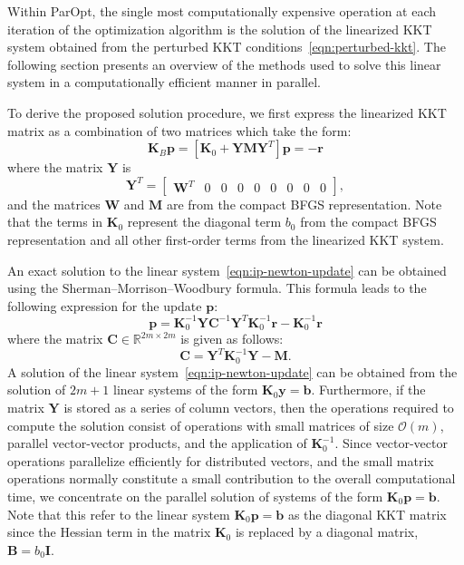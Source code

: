 \documentclass[12pt]{article}
\newcommand{\mb}{\mathbf}
\begin{document}
Within ParOpt, the single most computationally expensive operation at each iteration of the optimization algorithm is the solution of the linearized KKT system obtained from the perturbed KKT conditions~\eqref{eqn:perturbed-kkt}. 
The following section presents an overview of the methods used to solve this linear system in a computationally efficient manner in parallel. 

To derive the proposed solution procedure, we first express the linearized KKT matrix as a combination of two matrices which take the form:
%
\begin{equation}
  \label{eqn:ip-newton-update}
  \mb{K}_{B} \mb{p} = \left[ \mb{K}_{0} + \mb{Y} \mb{M} \mb{Y}^{T} \right] \mb{p} = - \mb{r}
\end{equation}
where the matrix $\mb{Y}$ is
%
\begin{equation*}
  \mb{Y}^{T} = \begin{bmatrix} \mb{W}^T & 0 & 0 & 
    0 & 0 & 0 & 0 & 0 & 0 \end{bmatrix}, 
\end{equation*}
and the matrices $\mb{W}$ and $\mb{M}$ are from the compact BFGS representation.
Note that the terms in $\mb{K}_{0}$ represent the diagonal term $b_{0}$ from the compact BFGS representation and all other first-order terms from the linearized KKT system.

An exact solution to the linear system~\eqref{eqn:ip-newton-update} can be obtained using the Sherman--Morrison--Woodbury formula.  
This formula leads to the following expression for the update $\mb{p}$:
\begin{equation*}
  \mb{p} = \mb{K}^{-1}_{0} \mb{Y} \mb{C}^{-1} \mb{Y}^{T} \mb{K}_{0}^{-1} \mb{r} - \mb{K}_{0}^{-1} \mb{r}  
\end{equation*}
where the matrix $\mb{C} \in \mathbb{R}^{2m \times 2m}$ is given as
follows:
\begin{equation*}
  \mb{C} = \mb{Y}^{T} \mb{K}_{0}^{-1}\mb{Y} - \mb{M}.
\end{equation*}
A solution of the linear system~\eqref{eqn:ip-newton-update} can be obtained from the solution of $2m+1$ linear systems of the form $\mb{K}_{0}\mb{y} = \mb{b}$.  
Furthermore, if the matrix $\mb{Y}$ is stored as a series of column vectors, then the operations required to compute the solution consist of operations with small matrices of size $\mathcal{O}(m)$, parallel vector-vector products, and the application of $\mb{K}_{0}^{-1}$. 
Since vector-vector operations parallelize efficiently for distributed vectors, and the small matrix operations normally constitute a small contribution to the overall computational time, we concentrate on the parallel solution of systems of the form $\mb{K}_{0} \mb{p} =
\mb{b}$. 
Note that this refer to the linear system $\mb{K}_{0} \mb{p} = \mb{b}$ as the diagonal KKT matrix since the Hessian term in the matrix $\mb{K}_{0}$ is replaced by a diagonal matrix, $\mb{B} = b_{0}\mb{I}$.
\end{document}
